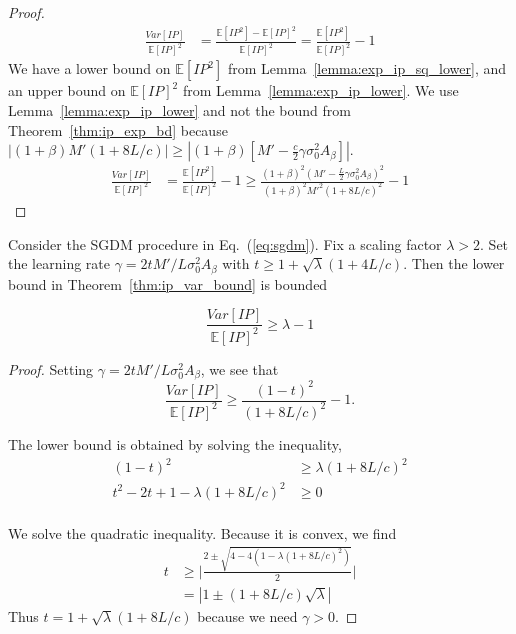 \documentclass[conference]{IEEEtran}
\newcommand{\Ex}[1]{\mathbb{E}[ #1 ]}
\newenvironment{customcor}[1]
   {\renewcommand\theinnercustomcor{#1}\innercustomcor}
   {\endinnercustomcor}
\begin{document}
\begin{proof}
\begin{align*}
\frac{Var [ IP ]}{\mathbb{E} [ IP ]^2} &= \frac{\mathbb{E} [ IP^2 ] - \mathbb{E} [ IP ]^2}{\mathbb{E} [ IP ]^2} 
= \frac{\mathbb{E} [ IP^2 ]}{\mathbb{E} [ IP ]^2}  - 1 
\end{align*}
We have a lower bound on $\Ex{IP^2}$ from Lemma~\ref{lemma:exp_ip_sq_lower}, and an upper bound on $\Ex{IP}^2$ from Lemma~\ref{lemma:exp_ip_lower}.
We use Lemma~\ref{lemma:exp_ip_lower} and not the bound from Theorem~\ref{thm:ip_exp_bd} 
because $|(1+\beta)M'(1+8L/c)| \geq |(1+\beta)[M' - \frac{c}{2} \gamma \sigma_0^2 A_\beta]|$.
\begin{align*}
\frac{Var [ IP ]}{\mathbb{E} [ IP ]^2} &= \frac{\mathbb{E} [ IP^2 ]}{\mathbb{E} [ IP ]^2}  - 1 
\geq \frac{ ( 1 + \beta )^2 ( M' - \frac{L}{2} \gamma \sigma_0^2 A_\beta )^2 } { (1 + \beta )^2 M'^2 ( 1 + 8 L / c )^2 }
- 1
\end{align*}
\end{proof}


\begin{customcor}{\ref{cor:set_gamma_threshold}}
Consider the SGDM procedure in Eq.~(\ref{eq:sgdm}). 
Fix a scaling factor $\lambda > 2$.
Set the learning rate $\gamma = 2 t M' / L \sigma_0^2 A_\beta$ with $t  \geq 1 + \sqrt{ \lambda } ( 1 + 4 L / c )$. Then the lower bound in Theorem~\ref{thm:ip_var_bound} 
is bounded 

\begin{equation*}
\frac{Var [ IP ]}{\mathbb{E} [ IP ]^2}  \geq \lambda - 1
\end{equation*}
\end{customcor}

\begin{proof}
Setting $\gamma = 2 t M' / L \sigma_0^2 A_\beta$, we see that
\begin{equation*}
\frac{Var [ IP ]}{\mathbb{E} [ IP ]^2} 
\geq \frac{ ( 1 - t )^2} { ( 1 + 8 L / c )^2 } - 1.
\end{equation*}

The lower bound is obtained by solving the inequality,
\begin{align*}
( 1 - t )^2 &\geq \lambda ( 1 + 8 L / c )^2 \\
t^2 - 2t + 1 - \lambda ( 1 + 8 L / c )^2 &\geq 0 \\
\end{align*}

We solve the quadratic inequality.
Because it is convex, we find
\begin{align*}
t &\geq \biggl| \frac{2 \pm \sqrt{ 4 - 4( 1 - \lambda ( 1 + 8 L / c )^2 ) }}{2} \biggr| \\
&= | 1 \pm ( 1 + 8 L / c ) \sqrt{ \lambda } |
\end{align*}
Thus $t = 1 + \sqrt{\lambda}(1 + 8 L / c)$ because we need $\gamma > 0$.
\end{proof}
\end{document}
